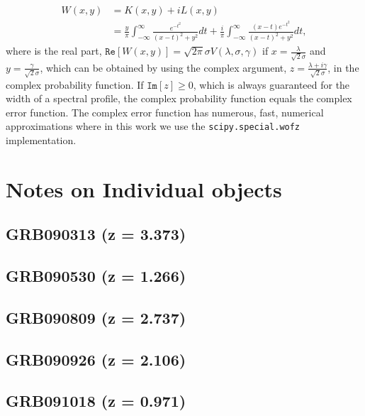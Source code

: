 \documentclass{aa}    %
\begin{document}
\begin{equation} 
\begin{split}
W(x, y)  
& = K(x, y) + i L(x, y) \\
& = \frac{y}{\pi}  \int_{-\infty}^{\infty} \frac{e^{- t^2 }}{(x -  t)^2 +y^2} dt  + \frac{i}{\pi}  \int_{-\infty}^{\infty} \frac{(x - t)e^{- t^2 }}{(x -  t)^2 +y^2} dt,
\end{split}
\end{equation}
where is the real part, $\mathtt{Re}[W(x, y)] =  \sqrt{2 \pi} \sigma V(\lambda,\sigma, \gamma)$ if $x = \frac{\lambda}{\sqrt{2} \sigma}$ and $y = \frac{\gamma}{\sqrt{2} \sigma}$, which can be obtained by using the complex argument, $z = \frac{\lambda + i\gamma}{\sqrt{2} \sigma}$, in the complex probability function. If $\mathtt{Im}[z] \geq 0$, which is always guaranteed for the width of a spectral profile, the complex probability function equals the complex error function. The complex error function has numerous, fast, numerical approximations where in this work we use the \texttt{scipy.special.wofz} \citep{scipy} implementation.




\section{Notes on Individual objects}

\subsection{GRB090313 (z = 3.373)}


\subsection{GRB090530 (z = 1.266)}


\subsection{GRB090809 (z = 2.737)}


\subsection{GRB090926 (z = 2.106)}


\subsection{GRB091018 (z = 0.971)}
\end{document}
